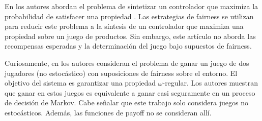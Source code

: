 En \cite{DBLP:conf/ifipTCS/BolligC04} los autores abordan el problema de sintetizar un controlador que maximiza la probabilidad de satisfacer una propiedad {\LTL}. Las estrategias de fairness se utilizan para reducir este problema a la síntesis de un controlador que maximiza una propiedad {\PCTL} sobre un juego de productos. Sin embargo, este artículo no aborda las recompensas esperadas y la determinación del juego bajo supuestos de fairness.

Curiosamente, en \cite{DBLP:conf/fossacs/AsarinCV10} los autores consideran el problema de ganar un juego de dos jugadores (no estocástico) con suposiciones de fairness sobre el entorno. El objetivo del sistema es garantizar una propiedad $\omega$-regular. Los autores muestran que ganar en estos juegos es equivalente a ganar casi seguramente en un proceso de decisión de Markov. Cabe señalar que este trabajo solo considera juegos no estocásticos. Además, las funciones de payoff no se consideran allí.


